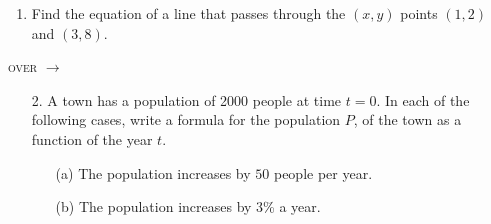 \documentclass[11pt]{article}
\begin{document}
\pagestyle{empty}
\newsavebox{\quizfront}
\begin{lrbox}{\quizfront}
\begin{minipage}[top][4.5in][t]{\textwidth} \setlength{\parindent}{1.5em}
\drawtitle
\vspace{-0.5in}
\begin{enumerate}

\item Find the equation of a line that passes through the $(x, y)$
  points $(1, 2)$ and $(3, 8)$.

  \vfill

\end{enumerate}

\hfill \textsc{over} $\longrightarrow$




\end{minipage}
\end{lrbox}

\newsavebox{\quizback}
\begin{lrbox}{\quizback}
\begin{minipage}[top][4.5in][t]{\textwidth} \setlength{\parindent}{1.5em}
\begin{itemize}
\item[2.] A town has a population of 2000 people at time $t = 0$.  In
  each of the following cases, write a formula for the population $P$,
  of the town as a function of the year $t$.
  \begin{itemize}
  \item[(a)] The population increases by $50$ people per year.
    \vfill
  \item[(b)] The population increases by 3\% a year.
    \vfill
  \end{itemize}


\end{itemize}
\end{minipage}
\end{lrbox}

\noindent \usebox{\quizfront}
\vfill
\noindent \usebox{\quizfront}

\pagebreak
\noindent \usebox{\quizback}
\vfill
\noindent \usebox{\quizback}
\end{document}
